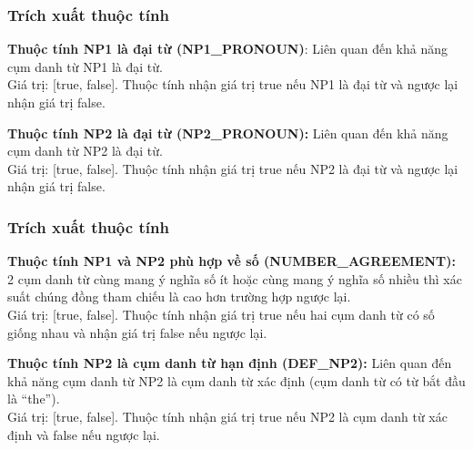 \documentclass{beamer}
\begin{document}
\begin{frame}
\frametitle{Trích xuất thuộc tính}

\begin{block}{}
\textbf{Thuộc tính NP1 là đại từ (NP1\_PRONOUN)}: Liên quan đến khả năng cụm danh từ NP1 là đại từ. 
\\Giá trị: [true, false]. Thuộc tính nhận giá trị true nếu NP1 là đại từ và ngược lại nhận giá trị false.
\end{block}

\begin{block}{}
\textbf{Thuộc tính NP2 là đại từ (NP2\_PRONOUN):} Liên quan đến khả năng cụm danh từ NP2 là đại từ. 
\\Giá trị: [true, false]. Thuộc tính nhận giá trị true nếu NP2 là đại từ và ngược lại nhận giá trị false.
\end{block}

\end{frame}

\begin{frame}
\frametitle{Trích xuất thuộc tính}

\begin{block}{}
\textbf{Thuộc tính NP1 và NP2 phù hợp về số (NUMBER\_AGREEMENT):} 2 cụm danh từ cùng mang ý nghĩa số ít hoặc cùng mang ý nghĩa số nhiều thì xác suất chúng đồng tham chiếu là cao hơn trường hợp ngược lại.
\\Giá trị: [true, false]. Thuộc tính nhận giá trị true nếu hai cụm danh từ có số giống nhau và nhận giá trị false nếu ngược lại.
\end{block}

\begin{block}{}
\textbf{Thuộc tính NP2 là cụm danh từ hạn định (DEF\_NP2):} Liên quan đến khả năng cụm danh từ NP2 là cụm danh từ xác định (cụm danh từ có từ bắt đầu là “the”).
\\Giá trị: [true, false]. Thuộc tính nhận giá trị true nếu NP2 là cụm danh từ xác định và false nếu ngược lại.
\end{block}

\end{frame}
\end{document}

